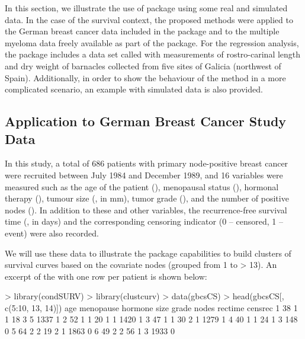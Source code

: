 In this section, we illustrate the use of  package using some real and simulated data. In the case of the survival context, the proposed methods were applied to the German breast cancer data included in the   package  and to the multiple myeloma data  freely available as part of the  package. For the  regression analysis, the  package includes a data set called  with measurements of rostro-carinal length and dry weight of barnacles collected from five sites of Galicia (northwest of Spain). Additionally, in order to show the behaviour of the method in a more complicated scenario, an example with simulated data is also provided. 

\subsection{Application to German Breast Cancer Study Data}

In this study, a total of 686 patients with primary node-positive breast cancer were recruited between July 1984 and December 1989, and 16 variables were measured such as the age of the patient (), menopausal status (), hormonal therapy (), tumour size (, in mm), tumor grade (), and the number of positive nodes (). In addition to these and other variables, the recurrence-free survival time (, in days) and the corresponding censoring indicator (0 -- censored, 1 -- event) were also recorded. 

We will use these data to illustrate the package capabilities to build clusters of survival curves based on the covariate nodes (grouped from 1 to > 13). An excerpt of the  with one row per patient is shown below:

\begin{example}
> library(condSURV)
> library(clustcurv)
> data(gbcsCS)
> head(gbcsCS[, c(5:10, 13, 14)])
  age menopause hormone size grade nodes rectime censrec
1  38         1       1   18     3     5    1337       1
2  52         1       1   20     1     1    1420       1
3  47         1       1   30     2     1    1279       1
4  40         1       1   24     1     3     148       0
5  64         2       2   19     2     1    1863       0
6  49         2       2   56     1     3    1933       0
\end{example}

